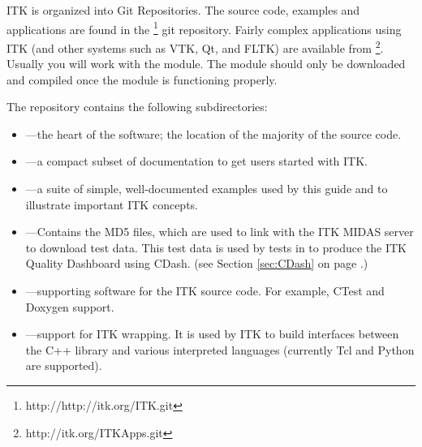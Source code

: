 ITK is organized into Git Repositories. The source code, examples and
applications are found in the
\footnote{http://http://itk.org/ITK.git} git
repository. Fairly complex applications using ITK (and other systems
such as VTK, Qt, and FLTK) are available from
\footnote{http://itk.org/ITKApps.git}. Usually
you will work with the  module. The  module should
only be downloaded and compiled once the  module is
functioning properly.

The  repository contains the following subdirectories:
\begin{itemize}
        \item {} ---the heart of the software; the location
        of the majority of the source code.
        \item {}---a compact subset of documentation
        to get users started with ITK.
        \item {}---a suite of simple, well-documented
        examples used by this guide and to illustrate important
        ITK concepts.
        \item {}---Contains the MD5 files, which are used
        to link with the ITK MIDAS server to download test data. This test data
        is used by tests in  to produce the ITK Quality Dashboard using CDash.
        (see Section \ref{sec:CDash} on
        page \pageref{sec:CDash}.)
        \item {}---supporting software for the ITK
        source code. For example, CTest and Doxygen support.
        \item {}---support for ITK wrapping.
        It is used by ITK to build interfaces between the C++ library and
        various interpreted languages (currently Tcl and Python are supported).
\end{itemize}

